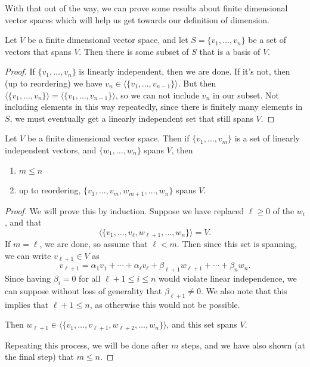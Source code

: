 \documentclass[a4paper]{scrartcl}
\begin{document}
With that out of the way, we can prove some results about finite dimensional vector spaces which will help us get towards our definition of dimension. 

\begin{lemma}
    Let $V$ be a finite dimensional vector space, and let $S = \{v_1, \dots, v_n\}$ be a set of vectors that spans $V$. Then there is some subset of $S$ that is a basis of $V$.
\end{lemma}
\begin{proof}
    If $\{v_1, \dots, v_n\}$ is linearly independent, then we are done. If it's not, then (up to reordering) we have $v_n \in \langle\{v_1, \dots, v_{n - 1}\}\rangle$. But then $\langle\{v_1, \dots, v_n\}\rangle = \langle\{v_1, \dots, v_{n - 1}\}\rangle$, so we can not include $v_n$ in our subset. Not including elements in this way repeatedly, since there is finitely many elements in $S$, we must eventually get a linearly independent set that still spans $V$.
\end{proof}

\begin{theorem}
    Let $V$ be a finite dimensional vector space. Then if $\{v_1, \dots, v_m\}$ is a set of linearly independent vectors, and $\{w_1, \dots, w_n\}$ spans $V$, then
    \begin{enumerate}[label=(\roman*)]
        \item $m \leq n$
        \item up to reordering, $\{v_1, \dots, v_m, w_{m + 1}, \dots, w_n\}$ spans $V$.
    \end{enumerate}
\end{theorem}
\begin{proof}
    We will prove this by induction. Suppose we have replaced $\ell \geq 0$ of the $w_i$, and that
    $$
    \langle \{ v_1, \dots, v_\ell, w_{\ell + 1}, \dots, w_n\}\rangle = V.
    $$
    If $m = \ell$, we are done, so assume that $\ell < m$. Then since this set is spanning, we can write $v_{\ell + 1} \in V$ as
    $$
    v_{\ell+1} = \alpha_1 v_1 + \cdots + \alpha_{\ell} v_{\ell} + \beta_{\ell + 1} w_{\ell + 1} + \cdots + \beta_n w_n.
    $$ 
    Since having $\beta_i = 0$ for all $\ell + 1 \leq i \leq n$ would violate linear independence, we can suppose without loss of generality that $\beta_{\ell + 1} \neq 0$. We also note that this implies that $\ell + 1 \leq n$, as otherwise this would not be possible.

    Then $w_{\ell + 1} \in \langle \{v_1, \dots, v_{\ell + 1}, w_{\ell + 2}, \dots, w_{n} \} \rangle$, and this set spans $V$.

    Repeating this process, we will be done after $m$ steps, and we have also shown (at the final step) that $m \leq n$.
\end{proof}
\end{document}
